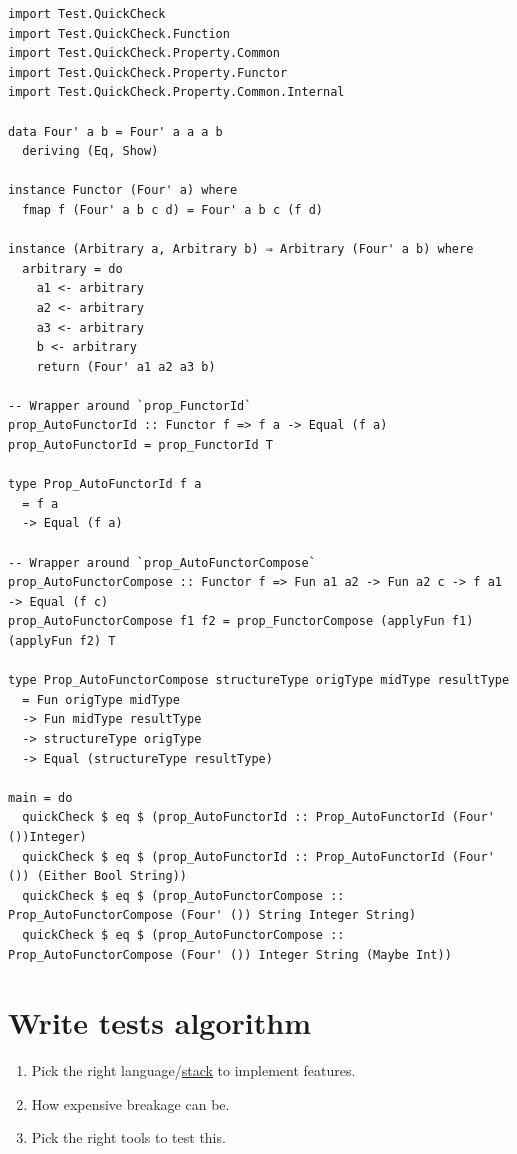 \documentclass[a4paper,14pt,oneside]{book}
\begin{document}
\begin{verbatim}
import Test.QuickCheck
import Test.QuickCheck.Function
import Test.QuickCheck.Property.Common
import Test.QuickCheck.Property.Functor
import Test.QuickCheck.Property.Common.Internal

data Four' a b = Four' a a a b
  deriving (Eq, Show)

instance Functor (Four' a) where
  fmap f (Four' a b c d) = Four' a b c (f d)

instance (Arbitrary a, Arbitrary b) ⇒ Arbitrary (Four' a b) where
  arbitrary = do
    a1 <- arbitrary
    a2 <- arbitrary
    a3 <- arbitrary
    b <- arbitrary
    return (Four' a1 a2 a3 b)

-- Wrapper around `prop_FunctorId`
prop_AutoFunctorId :: Functor f => f a -> Equal (f a)
prop_AutoFunctorId = prop_FunctorId T

type Prop_AutoFunctorId f a
  = f a
  -> Equal (f a)

-- Wrapper around `prop_AutoFunctorCompose`
prop_AutoFunctorCompose :: Functor f => Fun a1 a2 -> Fun a2 c -> f a1 -> Equal (f c)
prop_AutoFunctorCompose f1 f2 = prop_FunctorCompose (applyFun f1) (applyFun f2) T

type Prop_AutoFunctorCompose structureType origType midType resultType
  = Fun origType midType
  -> Fun midType resultType
  -> structureType origType
  -> Equal (structureType resultType)

main = do
  quickCheck $ eq $ (prop_AutoFunctorId :: Prop_AutoFunctorId (Four' ())Integer)
  quickCheck $ eq $ (prop_AutoFunctorId :: Prop_AutoFunctorId (Four' ()) (Either Bool String))
  quickCheck $ eq $ (prop_AutoFunctorCompose :: Prop_AutoFunctorCompose (Four' ()) String Integer String)
  quickCheck $ eq $ (prop_AutoFunctorCompose :: Prop_AutoFunctorCompose (Four' ()) Integer String (Maybe Int))
\end{verbatim}

\section{Write tests algorithm}
\label{sec:org632016f}

\begin{enumerate}
\item Pick the right language/\hyperref[org0bf13d8]{stack} to implement features.\\
\item How expensive breakage can be.\\
\item Pick the right tools to test this.\\
\end{enumerate}
\end{document}
